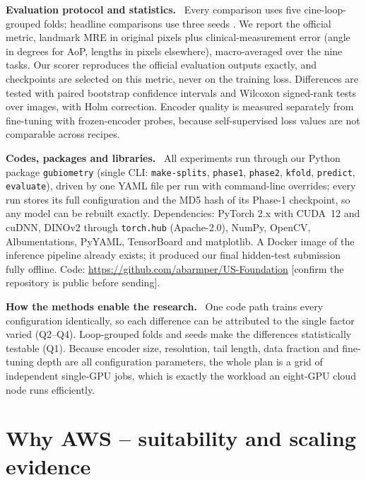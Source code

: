 \documentclass[11pt,a4paper]{article}
\newcommand{\para}[1]{\textbf{#1}\ }
\newcommand{\confirm}[1]{\textcolor{red!70!black}{[#1]}}
\begin{document}
\para{Evaluation protocol and statistics.} Every comparison uses five cine-loop-grouped folds; headline comparisons use three seeds \citep{bouthillier2021variance}. We report the official metric, landmark MRE in original pixels plus clinical-measurement error (angle in degrees for AoP, lengths in pixels elsewhere), macro-averaged over the nine tasks. Our scorer reproduces the official evaluation outputs exactly, and checkpoints are selected on this metric, never on the training loss. Differences are tested with paired bootstrap confidence intervals and Wilcoxon signed-rank tests over images, with Holm correction. Encoder quality is measured separately from fine-tuning with frozen-encoder probes, because self-supervised loss values are not comparable across recipes.

\para{Codes, packages and libraries.} All experiments run through our Python package \texttt{gubiometry} (single CLI: \texttt{make-splits}, \texttt{phase1}, \texttt{phase2}, \texttt{kfold}, \texttt{predict}, \texttt{evaluate}), driven by one YAML file per run with command-line overrides; every run stores its full configuration and the MD5 hash of its Phase-1 checkpoint, so any model can be rebuilt exactly. Dependencies: PyTorch 2.x with CUDA~12 and cuDNN, DINOv2 through \texttt{torch.hub} (Apache-2.0), NumPy, OpenCV, Albumentations, PyYAML, TensorBoard and matplotlib. A Docker image of the inference pipeline already exists; it produced our final hidden-test submission fully offline. Code: \url{https://github.com/abarmper/US-Foundation} \confirm{confirm the repository is public before sending}.

\para{How the methods enable the research.} One code path trains every configuration identically, so each difference can be attributed to the single factor varied (Q2--Q4). Loop-grouped folds and seeds make the differences statistically testable (Q1). Because encoder size, resolution, tail length, data fraction and fine-tuning depth are all configuration parameters, the whole plan is a grid of independent single-GPU jobs, which is exactly the workload an eight-GPU cloud node runs efficiently.

\section{Why AWS -- suitability and scaling evidence}
\label{sec:why}
\end{document}
